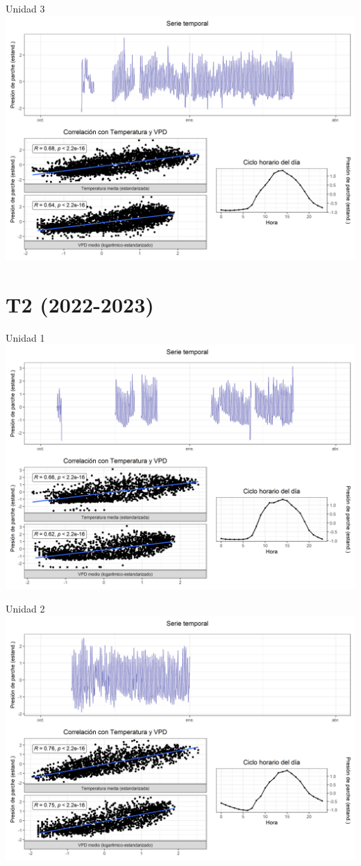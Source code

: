 \documentclass[
  letterpaper,
  DIV=11,
  numbers=noendperiod]{scrreprt}
\begin{document}
Unidad 3
\includegraphics{figuras/04_turgor_unidad/2022_2023_La_Esperanza_T1_Unidad_3.png}

\chapter{T2 (2022-2023)}

Unidad 1
\includegraphics{figuras/04_turgor_unidad/2022_2023_La_Esperanza_T2_Unidad_1.png}

Unidad 2
\includegraphics{figuras/04_turgor_unidad/2022_2023_La_Esperanza_T2_Unidad_2.png}
\end{document}
